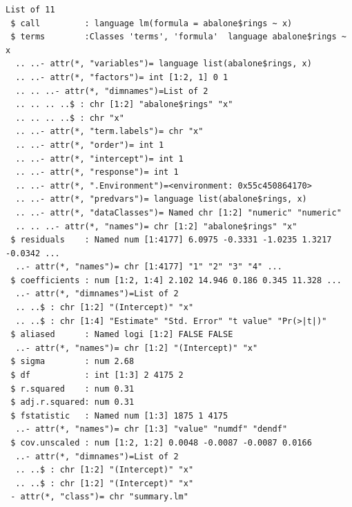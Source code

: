 \documentclass[
  11pt,
]{krantz}
\newenvironment{Shaded}{\begin{snugshade}}{\end{snugshade}}
\newcommand{\CommentTok}[1]{\textcolor[rgb]{0.37,0.37,0.37}{\textit{#1}}}
\newcommand{\ControlFlowTok}[1]{\textcolor[rgb]{0.27,0.27,0.27}{\textbf{#1}}}
\newcommand{\DecValTok}[1]{\textcolor[rgb]{0.06,0.06,0.06}{#1}}
\newcommand{\DocumentationTok}[1]{\textcolor[rgb]{0.37,0.37,0.37}{\textbf{\textit{#1}}}}
\newcommand{\FunctionTok}[1]{\textcolor[rgb]{0,0,0}{#1}}
\newcommand{\NormalTok}[1]{#1}
\newcommand{\OtherTok}[1]{\textcolor[rgb]{0.37,0.37,0.37}{#1}}
\newcommand{\SpecialCharTok}[1]{\textcolor[rgb]{0,0,0}{#1}}
\begin{document}
\begin{Shaded}
\end{Shaded}

\begin{verbatim}
List of 11
 $ call         : language lm(formula = abalone$rings ~ x)
 $ terms        :Classes 'terms', 'formula'  language abalone$rings ~ x
  .. ..- attr(*, "variables")= language list(abalone$rings, x)
  .. ..- attr(*, "factors")= int [1:2, 1] 0 1
  .. .. ..- attr(*, "dimnames")=List of 2
  .. .. .. ..$ : chr [1:2] "abalone$rings" "x"
  .. .. .. ..$ : chr "x"
  .. ..- attr(*, "term.labels")= chr "x"
  .. ..- attr(*, "order")= int 1
  .. ..- attr(*, "intercept")= int 1
  .. ..- attr(*, "response")= int 1
  .. ..- attr(*, ".Environment")=<environment: 0x55c450864170> 
  .. ..- attr(*, "predvars")= language list(abalone$rings, x)
  .. ..- attr(*, "dataClasses")= Named chr [1:2] "numeric" "numeric"
  .. .. ..- attr(*, "names")= chr [1:2] "abalone$rings" "x"
 $ residuals    : Named num [1:4177] 6.0975 -0.3331 -1.0235 1.3217 -0.0342 ...
  ..- attr(*, "names")= chr [1:4177] "1" "2" "3" "4" ...
 $ coefficients : num [1:2, 1:4] 2.102 14.946 0.186 0.345 11.328 ...
  ..- attr(*, "dimnames")=List of 2
  .. ..$ : chr [1:2] "(Intercept)" "x"
  .. ..$ : chr [1:4] "Estimate" "Std. Error" "t value" "Pr(>|t|)"
 $ aliased      : Named logi [1:2] FALSE FALSE
  ..- attr(*, "names")= chr [1:2] "(Intercept)" "x"
 $ sigma        : num 2.68
 $ df           : int [1:3] 2 4175 2
 $ r.squared    : num 0.31
 $ adj.r.squared: num 0.31
 $ fstatistic   : Named num [1:3] 1875 1 4175
  ..- attr(*, "names")= chr [1:3] "value" "numdf" "dendf"
 $ cov.unscaled : num [1:2, 1:2] 0.0048 -0.0087 -0.0087 0.0166
  ..- attr(*, "dimnames")=List of 2
  .. ..$ : chr [1:2] "(Intercept)" "x"
  .. ..$ : chr [1:2] "(Intercept)" "x"
 - attr(*, "class")= chr "summary.lm"
\end{verbatim}
\end{document}
